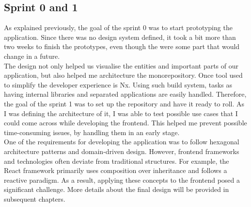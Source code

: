 \documentclass[../memory.tex]{subfiles}
\begin{document}
\subsection{Sprint 0 and 1}
As explained previously, the goal of the sprint 0 was to start prototyping the
application. Since there was no design system defined, it took a bit more than
two weeks to finish the prototypes, even though the were some part that would
change in a future.
\\
The design not only helped us visualise the entities and important parts of our
application, but also helped me architecture the monorepository. Once tool used
to simplify the developer experience is Nx. Using such build system, tasks as
having internal libraries and separated applications are easily handled.
Therefore, the goal of the sprint 1 was to set up the repository and have it
ready to roll. As I was defining the architecture of it, I was able to test
possible use cases that I could come across while developing the frontend. This
helped me prevent possible time-consuming issues, by handling them in an early
stage.
\\
One of the requirements for developing the application was to follow hexagonal
architecture patterns and domain-driven design. However, frontend frameworks and
technologies often deviate from traditional structures. For example, the React
framework primarily uses composition over inheritance and follows a reactive
paradigm. As a result, applying these concepts to the frontend posed a
significant challenge. More details about the final design will be provided in
subsequent chapters.
\end{document}

